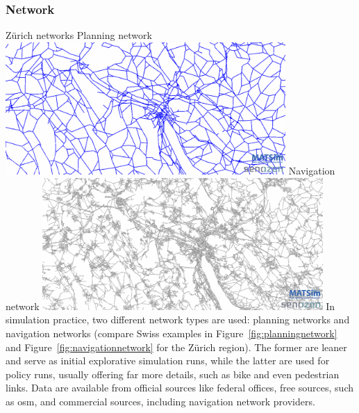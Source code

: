 \subsubsection{Network}
%
%
%
{Zürich networks}%
{\label{fig:zhnetwork}}%
{%
  \createsubfigure%
  {Planning network}%
  {\includegraphics[width=0.8\textwidth,angle=0]{using/figures/planning.png}}%
  {\label{fig:planningnetwork}}%
  {}%
  \createsubfigure%
  {Navigation network}%
	{\includegraphics[width=0.8\textwidth,angle=0]{using/figures/navigation.png}}%
  {\label{fig:navigationnetwork}}%
  {}%
}%
{}
%
In simulation practice, two different network types are used: planning networks and navigation networks (compare Swiss examples in Figure~\ref{fig:planningnetwork} and Figure~\ref{fig:navigationnetwork} for the Zürich region). The former are leaner and serve as initial explorative simulation runs, while the latter are used for policy runs, usually offering far more details, such as bike and even pedestrian links. Data are available from official sources like federal offices, free sources, such as \gls{osm}, and commercial sources, including navigation network providers.
%

